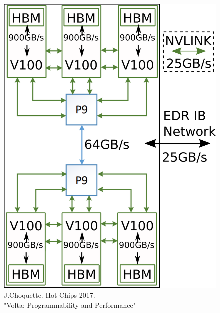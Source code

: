 \documentclass[aspectratio=169]{beamer}
\begin{document}
\begin{frame}
\begin{columns}
\begin{column}{0.3\textwidth}
\begin{figure}
        \includegraphics[width=.9\textwidth]{figures/summit-node.png}\\
        \tiny{J.Choquette. Hot Chips 2017. \\"Volta: Programmability and Performance"}
      \end{figure}
    \end{column}
    \end{columns}
\end{frame}
\end{document}
